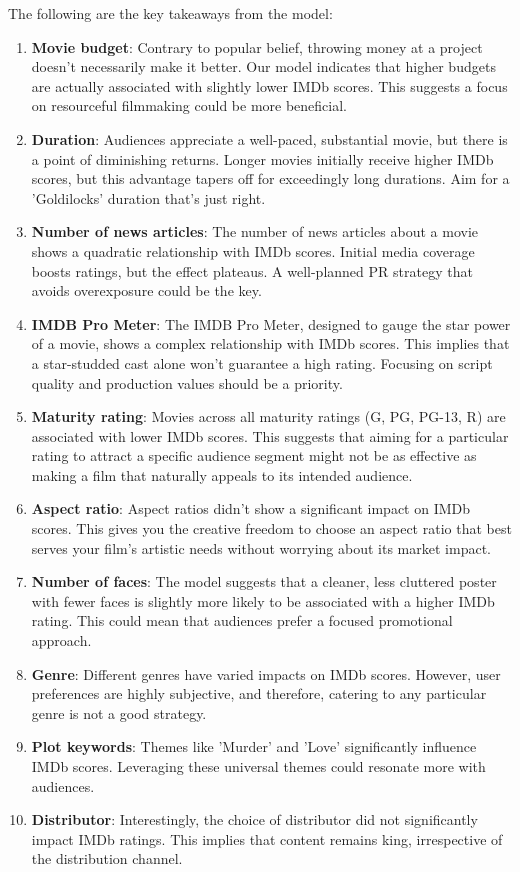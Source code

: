 \documentclass[12pt,a4paper]{article}
\begin{document}
The following are the key takeaways from the model:
\begin{enumerate}
    \item \textbf{Movie budget}: Contrary to popular belief, throwing money at a project doesn't necessarily make it better. Our model indicates that higher budgets are actually associated with slightly lower IMDb scores. This suggests a focus on resourceful filmmaking could be more beneficial.
    \item \textbf{Duration}: Audiences appreciate a well-paced, substantial movie, but there is a point of diminishing returns. Longer movies initially receive higher IMDb scores, but this advantage tapers off for exceedingly long durations. Aim for a 'Goldilocks' duration that's just right.
    \item \textbf{Number of news articles}: The number of news articles about a movie shows a quadratic relationship with IMDb scores. Initial media coverage boosts ratings, but the effect plateaus. A well-planned PR strategy that avoids overexposure could be the key.
    \item \textbf{IMDB Pro Meter}: The IMDB Pro Meter, designed to gauge the star power of a movie, shows a complex relationship with IMDb scores. This implies that a star-studded cast alone won't guarantee a high rating. Focusing on script quality and production values should be a priority.
    \item \textbf{Maturity rating}: Movies across all maturity ratings (G, PG, PG-13, R) are associated with lower IMDb scores. This suggests that aiming for a particular rating to attract a specific audience segment might not be as effective as making a film that naturally appeals to its intended audience.
    \item \textbf{Aspect ratio}: Aspect ratios didn't show a significant impact on IMDb scores. This gives you the creative freedom to choose an aspect ratio that best serves your film's artistic needs without worrying about its market impact.
    \item \textbf{Number of faces}: The model suggests that a cleaner, less cluttered poster with fewer faces is slightly more likely to be associated with a higher IMDb rating. This could mean that audiences prefer a focused promotional approach.
    \item \textbf{Genre}: Different genres have varied impacts on IMDb scores. However, user preferences are highly subjective, and therefore, catering to any particular genre is not a good strategy.
    \item \textbf{Plot keywords}: Themes like 'Murder' and 'Love' significantly influence IMDb scores. Leveraging these universal themes could resonate more with audiences.
    \item \textbf{Distributor}: Interestingly, the choice of distributor did not significantly impact IMDb ratings. This implies that content remains king, irrespective of the distribution channel.
\end{enumerate}
\end{document}
